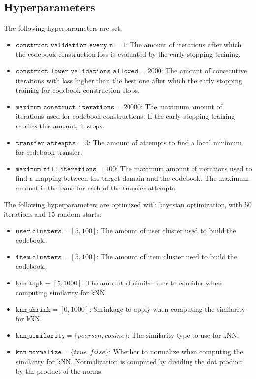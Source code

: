 \subsection{Hyperparameters}

The following hyperparameters are set:
\begin{itemize}
\item $\texttt{construct\_validation\_every\_n} = 1$: The amount of iterations after which the codebook construction loss is evaluated by the early stopping training.
\item $\texttt{construct\_lower\_validations\_allowed} = 2000$: The amount of consecutive iterations with loss higher than the best one after which the early stopping training for codebook construction stops.
\item $\texttt{maximum\_construct\_iterations} = 20000$: The maximum amount of iterations used for codebook constructions. If the early stopping training reaches this amount, it stops.
\item $\texttt{transfer\_attempts} = 3$: The amount of attempts to find a local minimum for codebook transfer.
\item $\texttt{maximum\_fill\_iterations} = 100$: The maximum amount of iterations used to find a mapping between the target domain and the codebook. The maximum amount is the same for each of the transfer attempts.
\end{itemize}
The following hyperparameters are optimized with bayesian optimization, with 50 iterations and 15 random starts:
\begin{itemize}
\item $\texttt{user\_clusters} = [5,100]$: The amount of user cluster used to build the codebook.
\item $\texttt{item\_clusters} = [5,100]$: The amount of item cluster used to build the codebook.
\item $\texttt{knn\_topk} = [5,1000]$: The amount of similar user to consider when computing similarity for kNN.
\item $\texttt{knn\_shrink} = [0,1000]$: Shrinkage to apply when computing the similarity for kNN.
\item $\texttt{knn\_similarity} = \{pearson,cosine\}$: The similarity type to use for kNN.
\item $\texttt{knn\_normalize} = \{true,false\}$: Whether to normalize when computing the similarity for kNN. Normalization is computed by dividing the dot product by the product of the norms.
\end{itemize}


